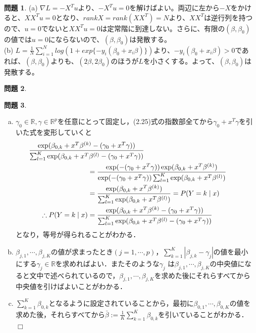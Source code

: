 \documentclass[titlepage]{jsarticle}
\theoremstyle{definition}
\newtheorem{Ex}{問題}
\theoremstyle{mystyle} %
\def\qed{\hfill$\Box$}
\begin{document}
\begin{Ex}
\noindent(a) $\nabla L = -X^T u$より、$ -X^T u=0$を解けばよい。両辺に左から$-X$をかけると、$ XX^T u=0$となり、$rankX=rank(XX^T)=N$より、$XX^T$は逆行列を持つので、$u=0$でないと$ XX^T u=0$は定常階に到達しない。さらに、有限の$(\beta, \beta_0)$の値では$u=0$にならないので、$(\beta, \beta_0)$は発散する。\\[1mm]

\noindent(b) $L=\frac{1}{N}\sum_{i=1}^{N}log(1+exp\{-y_i (\beta_0+x_i\beta)\})$より、$-y_i (\beta_0+x_i\beta)>0$であれば、$(\beta, \beta_0)$よりも、$(2\beta, 2\beta_0)$のほうが$L$を小さくする。よって、$(\beta, \beta_0)$は発散する。\\[1mm]
\end{Ex}
\begin{Ex}

\end{Ex}
\begin{Ex}
\begin{enumerate}[(a)]
\item $\gamma_0\in\mathbb{R},\gamma\in\mathbb{R}^p$を任意にとって固定し，(2.25)式の指数部全てから$\gamma_0+x^T\gamma$を引いた式を変形していくと
\begin{align*}
&\hspace{-3cm}\frac{\exp(\beta_{0,k}+x^T\beta^{(k)}-(\gamma_0+x^T\gamma))}{\sum_{l=1}^K\exp(\beta_{0,k}+x^T\beta^{(l)}-(\gamma_0+x^T\gamma))}\\
&=\frac{\exp(-(\gamma_0+x^T\gamma))\exp(\beta_{0,k}+x^T\beta^{(k)})}{\exp(-(\gamma_0+x^T\gamma))\sum_{l=1}^K\exp(\beta_{0,k}+x^T\beta^{(l)})}\\
&=\frac{\exp(\beta_{0,k}+x^T\beta^{(k)})}{\sum_{l=1}^K\exp(\beta_{0,k}+x^T\beta^{(l)})}=P(Y=k\mid x)\\
\therefore P(Y=k\mid x)&=\frac{\exp(\beta_{0,k}+x^T\beta^{(k)}-(\gamma_0+x^T\gamma))}{\sum_{l=1}^K\exp(\beta_{0,k}+x^T\beta^{(l)}-(\gamma_0+x^T\gamma))}
\end{align*}
となり，等号が得られることがわかる．\\

\item $\beta_{j,1},\cdots,\beta_{j,K}$の値が求まったとき$(j=1,\cdots,p)$，$\displaystyle \sum_{k=1}^K|\beta_{j,k}-\gamma_j|$の値を最小にする$\gamma_j\in\mathbb{R}$を求めればよい．またそのような$\gamma_j$ は$\beta_{j,1},\cdots,\beta_{j,K}$の中央値になると文中で述べられているので，$\beta_{j,1},\cdots,\beta_{j,K}$を求めた後にそれらすべてから中央値を引けばよいことがわかる．\\

\item $\displaystyle \sum_{k=1}^K\beta_{0,k}$となるように設定されていることから，最初に$\beta_{0,1},\cdots,\beta_{0,K}$の値を求めた後，それらすべてから$\bar{\beta}:=\displaystyle \frac{1}{K}\sum_{k=1}^K\beta_{0,k}$を引いていることがわかる．\qed\\
\end{enumerate}
\end{Ex}
\end{document}
